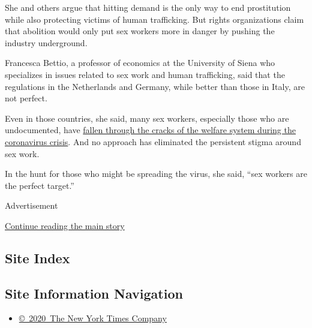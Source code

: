 She and others argue that hitting demand is the only way to end
prostitution while also protecting victims of human trafficking. But
rights organizations claim that abolition would only put sex workers
more in danger by pushing the industry underground.

Francesca Bettio, a professor of economics at the University of Siena
who specializes in issues related to sex work and human trafficking,
said that the regulations in the Netherlands and Germany, while better
than those in Italy, are not perfect.

Even in those countries, she said, many sex workers, especially those
who are undocumented, have
\href{https://www.nytimes.com/2020/06/03/world/europe/amsterdam-red-light-coronavirus.html}{fallen
through the cracks of the welfare system during the coronavirus crisis}.
And no approach has eliminated the persistent stigma around sex work.

In the hunt for those who might be spreading the virus, she said, ``sex
workers are the perfect target.''

Advertisement

\protect\hyperlink{after-bottom}{Continue reading the main story}

\hypertarget{site-index}{%
\subsection{Site Index}\label{site-index}}

\hypertarget{site-information-navigation}{%
\subsection{Site Information
Navigation}\label{site-information-navigation}}

\begin{itemize}
\tightlist
\item
  \href{https://help.nytimes.com/hc/en-us/articles/115014792127-Copyright-notice}{©~2020~The
  New York Times Company}
\end{itemize}

